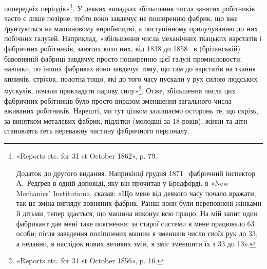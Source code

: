 \parcont{}  %
попередніх періодів»\footnote{
«Reports etc. for 31 st October 1862», p. 79.

Додаток до другого видання. Наприкінці грудня 1871~ фабричний
інспектор А.~Редґрев в одній доповіді, яку він прочитав у Бредфорді, в
«New Mechanics’ Institution», сказав: «Що мене від деякого часу почало
вражати, так це зміна вигляду вовняних фабрик. Раніш вони були переповнені
жінками й дітьми, тепер здається, що машина виконує всю працю.
На мій запит один фабрикант дав мені таке пояснення: за старої системи в
мене працювало 63 особи; після заведення поліпшених машин я зменшив
число своїх рук до 33, а недавно, в наслідок нових великих змін, я зміг
зменшити їх з 33 до 13».
}. У деяких випадках збільшення числа
занятих робітників часто є лише позірне, тобто воно завдячує не
поширенню фабрик, що вже ґрунтуються на машиновому виробництві,
а поступінному прилучуванню до них побічних галузей.
Наприклад, «збільшення числа механічних ткацьких варстатів
і фабричних робітників, занятих коло них, від 1838 до 1858~
в (брітанській) бавовняній фабриці завдячує просто поширенню
цієї галузі промисловости; навпаки, по інших фабриках воно
завдячує тому, що там до варстатів на ткання килимів, стрічок,
полотна тощо, які до того часу пускали у рух силою людських
мускулів, почали прикладати парову силу»\footnote{
«Reports etc. for 31 st October 1856», p. 16.
}. Отже, збільшення
числа цих фабричних робітників було просто виразом зменшення
загального числа вживаних робітників. Нарешті, ми тут цілком
залишаємо осторонь те, що скрізь, за винятком металевих фабрик,
підлітки (молодші за 18 років), жінки та діти становлять геть
переважну частину фабричного персоналу.


